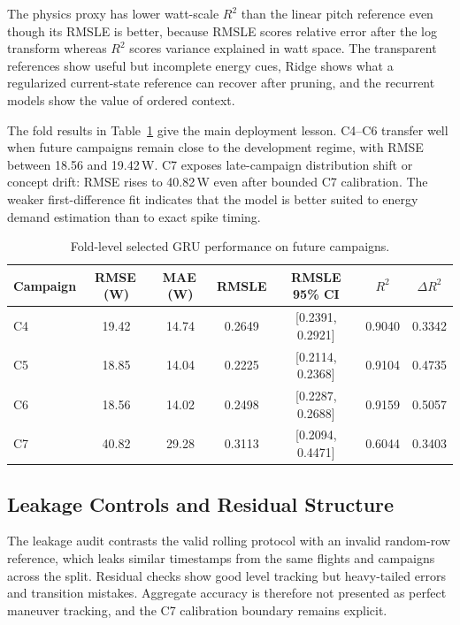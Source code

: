 \documentclass[runningheads,a4paper]{llncs}
\begin{document}
The physics proxy has lower watt-scale $R^2$ than the linear pitch reference even though its RMSLE is better, because RMSLE scores relative error after the log transform whereas $R^2$ scores variance explained in watt space. The transparent references show useful but incomplete energy cues, Ridge shows what a regularized current-state reference can recover after pruning, and the recurrent models show the value of ordered context.

The fold results in Table~\ref{tab:foldgru} give the main deployment lesson. C4--C6 transfer well when future campaigns remain close to the development regime, with RMSE between 18.56 and 19.42\,W. C7 exposes late-campaign distribution shift or concept drift: RMSE rises to 40.82\,W even after bounded C7 calibration. The weaker first-difference fit indicates that the model is better suited to energy demand estimation than to exact spike timing.

\begin{table}[!htbp]
\caption{Fold-level selected GRU performance on future campaigns.}
\label{tab:foldgru}
\centering
{\small
\begin{tabular}{lcccccc}
\toprule
Campaign & RMSE\,(W) & MAE\,(W) & RMSLE & RMSLE 95\% CI & $R^2$ & $\Delta R^2$ \\
\midrule
C4 & 19.42 & 14.74 & 0.2649 & [0.2391, 0.2921] & 0.9040 & 0.3342 \\
C5 & 18.85 & 14.04 & 0.2225 & [0.2114, 0.2368] & 0.9104 & 0.4735 \\
C6 & 18.56 & 14.02 & 0.2498 & [0.2287, 0.2688] & 0.9159 & 0.5057 \\
C7 & 40.82 & 29.28 & 0.3113 & [0.2094, 0.4471] & 0.6044 & 0.3403 \\
\bottomrule
\end{tabular}
}
\end{table}
\FloatBarrier

\subsection{Leakage Controls and Residual Structure}

The leakage audit contrasts the valid rolling protocol with an invalid random-row reference, which leaks similar timestamps from the same flights and campaigns across the split. Residual checks show good level tracking but heavy-tailed errors and transition mistakes. Aggregate accuracy is therefore not presented as perfect maneuver tracking, and the C7 calibration boundary remains explicit.
\end{document}
